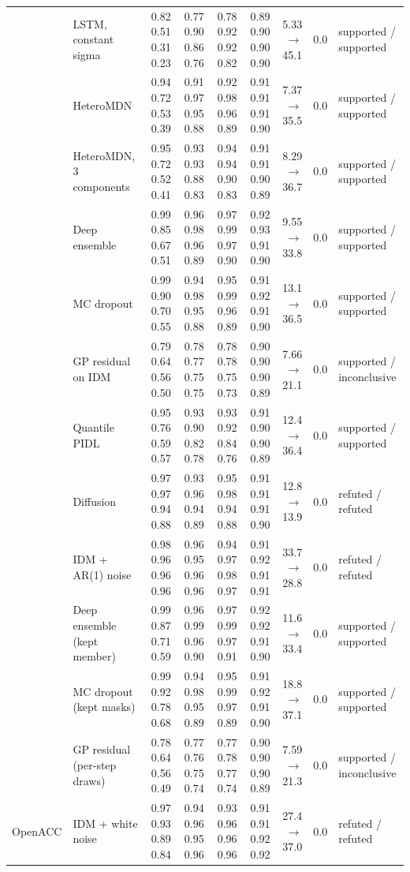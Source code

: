 \begin{longtable}{llrrrrrrl}
 & LSTM, constant sigma & 0.82 0.51 0.31 0.23 & 0.77 0.90 0.86 0.76 & 0.78 0.92 0.92 0.82 & 0.89 0.90 0.90 0.90 & 5.33 $\rightarrow$ 45.1 & 0.0 & supported / supported \\
 & HeteroMDN & 0.94 0.72 0.53 0.39 & 0.91 0.97 0.95 0.88 & 0.92 0.98 0.96 0.89 & 0.91 0.91 0.91 0.90 & 7.37 $\rightarrow$ 35.5 & 0.0 & supported / supported \\
 & HeteroMDN, 3 components & 0.95 0.72 0.52 0.41 & 0.93 0.93 0.88 0.83 & 0.94 0.94 0.90 0.83 & 0.91 0.91 0.90 0.89 & 8.29 $\rightarrow$ 36.7 & 0.0 & supported / supported \\
 & Deep ensemble & 0.99 0.85 0.67 0.51 & 0.96 0.98 0.96 0.89 & 0.97 0.99 0.97 0.90 & 0.92 0.93 0.91 0.90 & 9.55 $\rightarrow$ 33.8 & 0.0 & supported / supported \\
 & MC dropout & 0.99 0.90 0.70 0.55 & 0.94 0.98 0.95 0.88 & 0.95 0.99 0.96 0.89 & 0.91 0.92 0.91 0.90 & 13.1 $\rightarrow$ 36.5 & 0.0 & supported / supported \\
 & GP residual on IDM & 0.79 0.64 0.56 0.50 & 0.78 0.77 0.75 0.75 & 0.78 0.78 0.75 0.73 & 0.90 0.90 0.90 0.89 & 7.66 $\rightarrow$ 21.1 & 0.0 & supported / inconclusive \\
 & Quantile PIDL & 0.95 0.76 0.59 0.57 & 0.93 0.90 0.82 0.78 & 0.93 0.92 0.84 0.76 & 0.91 0.90 0.90 0.89 & 12.4 $\rightarrow$ 36.4 & 0.0 & supported / supported \\
 & Diffusion & 0.97 0.97 0.94 0.88 & 0.93 0.96 0.94 0.89 & 0.95 0.98 0.94 0.88 & 0.91 0.91 0.91 0.90 & 12.8 $\rightarrow$ 13.9 & 0.0 & refuted / refuted \\
 & IDM + AR(1) noise & 0.98 0.96 0.96 0.96 & 0.96 0.95 0.96 0.96 & 0.94 0.97 0.98 0.97 & 0.91 0.92 0.91 0.91 & 33.7 $\rightarrow$ 28.8 & 0.0 & refuted / refuted \\
 & Deep ensemble (kept member) & 0.99 0.87 0.71 0.59 & 0.96 0.99 0.96 0.90 & 0.97 0.99 0.97 0.91 & 0.92 0.92 0.91 0.90 & 11.6 $\rightarrow$ 33.4 & 0.0 & supported / supported \\
 & MC dropout (kept masks) & 0.99 0.92 0.78 0.68 & 0.94 0.98 0.95 0.89 & 0.95 0.99 0.97 0.89 & 0.91 0.92 0.91 0.90 & 18.8 $\rightarrow$ 37.1 & 0.0 & supported / supported \\
 & GP residual (per-step draws) & 0.78 0.64 0.56 0.49 & 0.77 0.76 0.75 0.74 & 0.77 0.78 0.77 0.74 & 0.90 0.90 0.90 0.89 & 7.59 $\rightarrow$ 21.3 & 0.0 & supported / inconclusive \\
\midrule
OpenACC & IDM + white noise & 0.97 0.93 0.89 0.84 & 0.94 0.96 0.95 0.96 & 0.93 0.96 0.96 0.96 & 0.91 0.91 0.92 0.92 & 27.4 $\rightarrow$ 37.0 & 0.0 & refuted / refuted \\

\end{longtable}
